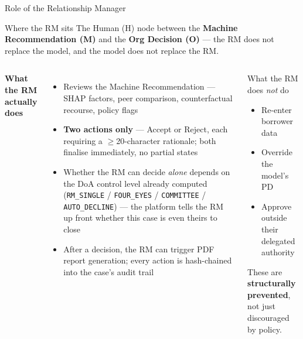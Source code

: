 \documentclass[9pt,aspectratio=169]{beamer}
\begin{document}
\begin{frame}{Role of the Relationship Manager}
\vspace{-2pt}
\begin{block}{Where the RM sits}
  \footnotesize
  The Human (H) node between the \textbf{Machine Recommendation (M)} and the
  \textbf{Org Decision (O)} --- the RM does not replace the model, and the model does not
  replace the RM.
\end{block}
\vspace{6pt}
\begin{columns}[T]
    \footnotesize\textbf{What the RM actually does}
    \begin{itemize}\setlength\itemsep{3pt}\footnotesize
      \item[\small$\bullet$] Reviews the Machine Recommendation --- SHAP factors, peer comparison,
            counterfactual recourse, policy flags
      \item[\small$\bullet$] \textbf{Two actions only} --- Accept or Reject, each requiring a
            $\geq$20-character rationale; both finalise immediately, no partial states
      \item[\small$\bullet$] Whether the RM can decide \emph{alone} depends on the DoA control
            level already computed (\texttt{RM\_SINGLE} / \texttt{FOUR\_EYES} / \texttt{COMMITTEE}
            / \texttt{AUTO\_DECLINE}) --- the platform tells the RM up front whether this case is
            even theirs to close
      \item[\small$\bullet$] After a decision, the RM can trigger PDF report generation; every
            action is hash-chained into the case's audit trail
    \end{itemize}
    \begin{alertblock}{What the RM does \emph{not} do}
      \footnotesize
      \begin{itemize}\setlength\itemsep{3pt}
        \item[\small$\bullet$] Re-enter borrower data
        \item[\small$\bullet$] Override the model's PD
        \item[\small$\bullet$] Approve outside their delegated authority
      \end{itemize}
      \vspace{3pt}
      These are \textbf{structurally prevented}, not just discouraged by policy.
    \end{alertblock}
\end{columns}
\end{frame}

\end{document}
